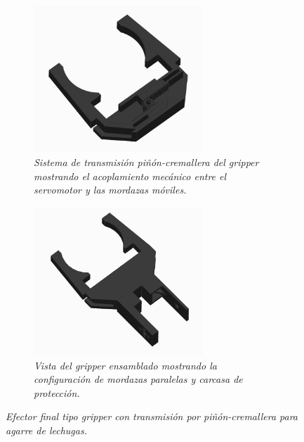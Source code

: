 \begin{figure}[H]
    \centering
    \begin{subfigure}{0.35\textwidth}
        \centering
        \includegraphics[width=0.7\textwidth]{img/gripper.jpg}
        \caption{\textit{Sistema de transmisión piñón-cremallera del gripper mostrando el acoplamiento mecánico entre el servomotor y las mordazas móviles.}}
        \label{fig:gripper_Real_transmision}
    \end{subfigure}
    \hspace{0.5cm}
    \begin{subfigure}{0.35\textwidth}
        \centering
        \includegraphics[width=0.7\textwidth]{img/pinza_tapa.png}
        \caption{\textit{Vista del gripper ensamblado mostrando la configuración de mordazas paralelas y carcasa de protección.}}
        \label{fig:gripper_Real}
    \end{subfigure}
    \caption{\textit{Efector final tipo gripper con transmisión por piñón-cremallera para agarre de lechugas.}}
\end{figure}

